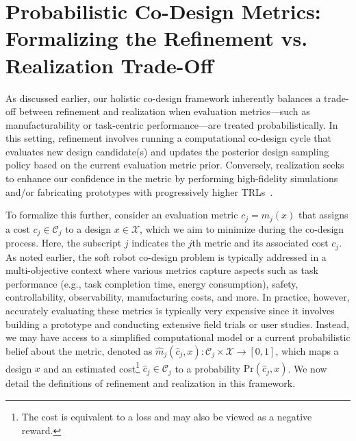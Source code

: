 \section{Probabilistic Co-Design Metrics: Formalizing the Refinement vs. Realization Trade-Off}\label{sec:apx:holisticcodesign:probabilistic_co_design_metrics}
As discussed earlier, our holistic co-design framework inherently balances a trade-off between refinement and realization when evaluation metrics—such as manufacturability or task-centric performance—are treated probabilistically. In this setting, refinement involves running a computational co-design cycle that evaluates new design candidate(s) and updates the posterior design sampling policy based on the current evaluation metric prior. Conversely, realization seeks to enhance our confidence in the metric by performing high-fidelity simulations and/or fabricating prototypes with progressively higher \glspl{TRL}~\citep{junge2022leveraging}.

To formalize this further, consider an evaluation metric $c_j = m_j(x)$ that assigns a cost $c_j \in \mathcal{C}_j$ to a design $x \in \mathcal{X}$, which we aim to minimize during the co-design process. 
Here, the subscript $j$ indicates the $j$th metric and its associated cost $c_j$.
As noted earlier, the soft robot co-design problem is typically addressed in a multi-objective context where various metrics capture aspects such as task performance (e.g., task completion time, energy consumption), safety, controllability, observability, manufacturing costs, and more. 
In practice, however, accurately evaluating these metrics is typically very expensive since it involves building a prototype and conducting extensive field trials or user studies. Instead, we may have access to a simplified computational model or a current probabilistic belief about the metric, denoted as $\hat{m}_j(\hat{c}_j, x): \mathcal{C}_j \times \mathcal{X} \to [0,1]$,
which maps a design $x$ and an estimated cost\footnote{The cost is equivalent to a loss and may also be viewed as a negative reward.} $\hat{c}_j \in \mathcal{C}_j$ to a probability $\mathrm{Pr}(\hat{c}_j,x)$.
We now detail the definitions of refinement and realization in this framework.

